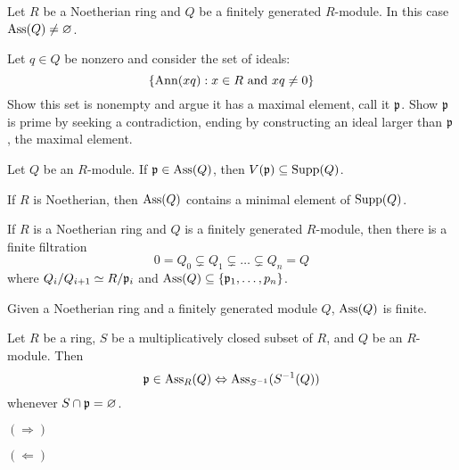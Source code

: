 \documentclass{ximera}
\begin{document}
\begin{proposition}
  Let $R$ be a Noetherian ring and $Q$ be a finitely generated
  $R$-module. In this case $\operatorname{Ass}(Q) \ne \varnothing$.
  \begin{sketch}
    Let $q\in Q$ be nonzero and consider the set of ideals:
    \[
    \{\operatorname{Ann}(xq): x\in R\text{ and }xq\ne 0 \}
    \]
    Show this set is nonempty and argue it has a maximal element, call
    it $\mathfrak{p}$. Show $\mathfrak{p}$ is prime by seeking a contradiction, ending by
    constructing an ideal larger than $\mathfrak{p}$, the maximal element.
  \end{sketch}
\end{proposition}


\begin{proposition}
  Let $Q$ be an $R$-module. If $\mathfrak{p}\in\operatorname{Ass}(Q)$, then $V(\mathfrak{p})\subseteq
  \operatorname{Supp}(Q)$.
  \begin{sketch}
    
  \end{sketch}
\end{proposition}

\begin{proposition}
  If $R$ is Noetherian, then $\operatorname{Ass}(Q)$ contains a minimal element of
  $\operatorname{Supp}(Q)$.
\end{proposition}


\begin{proposition}
  If $R$ is a Noetherian ring and $Q$ is a finitely generated
  $R$-module, then there is a finite filtration
  \[
  0 = Q_0 \subsetneq Q_1 \subsetneq \dots \subsetneq Q_n = Q 
  \]
  where $Q_i/Q_{i+1} \simeq R/\mathfrak{p}_i$ and $\operatorname{Ass}(Q) \subseteq
  \{\mathfrak{p}_1,\dots,p_n\}$.
\end{proposition}

\begin{corollary}
  Given a Noetherian ring and a finitely generated module $Q$,
  $\operatorname{Ass}(Q)$ is finite.
\end{corollary}





\begin{proposition}
  Let $R$ be a ring, $S$ be a multiplicatively closed subset of $R$,
  and $Q$ be an $R$-module. Then
  \[
  \mathfrak{p} \in \operatorname{Ass}_R(Q) \Leftrightarrow \operatorname{Ass}_{S^{-1}}(S^{-1}(Q))
  \]
  whenever $S\cap\mathfrak{p} = \varnothing$.
  \begin{sketch}
    $(\Rightarrow)$

    $(\Leftarrow)$
  \end{sketch}
\end{proposition}
\end{document}
